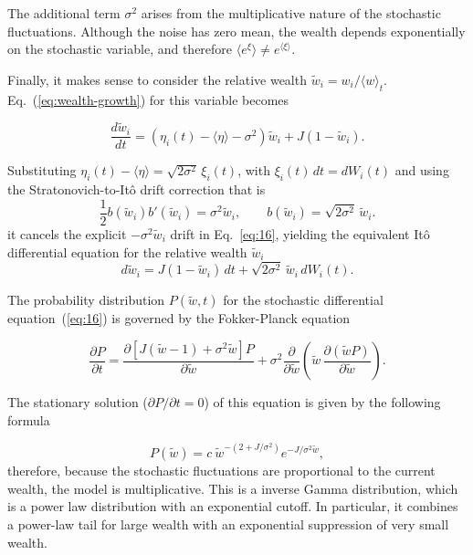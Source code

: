 The additional term $\sigma^2$ arises from the multiplicative nature of
the stochastic fluctuations. Although the noise has zero mean, the
wealth depends exponentially on the stochastic variable, and therefore
$\langle e^{\xi}\rangle \neq e^{\langle\xi\rangle}$. 




Finally, it makes sense to consider the relative wealth $\tilde{w}_i = w_i/\langle w\rangle_t$. Eq.~(\ref{eq:wealth-growth}) 
for this variable becomes

\begin{equation}
  \frac{d\tilde{w}_i}{dt} = \left(\eta_i(t) - \langle\eta\rangle - \sigma^2\right)\tilde{w}_i + J(1 - \tilde{w}_i).
  \label{eq:16}
\end{equation}

Substituting $\eta_i(t)-\langle\eta\rangle=\sqrt{2\sigma^2}\,\xi_i(t)$, with $\xi_i(t)\,dt=dW_i(t)$
and using the Stratonovich-to-It\^o drift correction that is
\begin{equation}
\frac{1}{2}b(\tilde{w}_i)b'(\tilde{w}_i)
=
\sigma^2\tilde{w}_i,
\qquad
b(\tilde{w}_i)=\sqrt{2\sigma^2}\,\tilde{w}_i.
\end{equation}
it cancels the explicit $-\sigma^2\tilde{w}_i$ drift in Eq.~\eqref{eq:16}, yielding the equivalent It\^o differential equation for the relative wealth $\tilde{w}_i$ 
\begin{equation}
\label{eq:ito-Relativewealth}
d\tilde{w}_i
=
J(1-\tilde{w}_i)\,dt
+
\sqrt{2\sigma^2}\,\tilde{w}_i\,dW_i(t).
\end{equation}


The probability distribution $P(\tilde{w},t)$ for the stochastic differential equation~(\ref{eq:16}) is governed by the Fokker-Planck equation

\begin{equation}
  \frac{\partial P}{\partial t} = \frac{\partial \left[J(\tilde{w}-1) + \sigma^2\tilde{w}\right]P}{\partial \tilde{w}}
  + \sigma^2 \frac{\partial}{\partial \tilde{w}}\left(\tilde{w}\,\frac{\partial(\tilde{w}P)}{\partial \tilde{w}}\right).
  \label{eq:17}
\end{equation}

The stationary solution ($\partial P/\partial t = 0$) of this equation is given by the following formula

\begin{equation}
  P(\tilde{w}) = c\ \tilde{w}^{-(2+J/\sigma^2)} e^{-J/\sigma^2\tilde{w}},
  \label{eq:18}
\end{equation}
therefore, because the stochastic fluctuations are proportional to the current wealth, the model is multiplicative. 
This is a inverse Gamma distribution, which is a power law distribution with an exponential cutoff.
In particular, it combines a power-law tail for large wealth with an exponential suppression of very small wealth.


\newpage